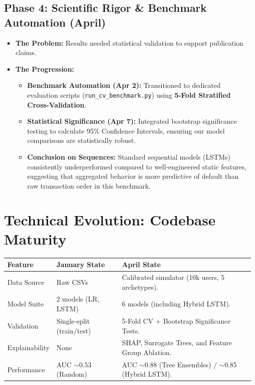 \documentclass[11pt]{article}
\begin{document}
\subsection{Phase 4: Scientific Rigor \& Benchmark Automation (April)}
\begin{itemize}[noitemsep]
    \item \textbf{The Problem:} Results needed statistical validation to support publication claims.
    \item \textbf{The Progression:}
    \begin{itemize}
        \item \textbf{Benchmark Automation (Apr 2):} Transitioned to dedicated evaluation scripts (\texttt{run\_cv\_benchmark.py}) using \textbf{5-Fold Stratified Cross-Validation}.
        \item \textbf{Statistical Significance (Apr 7):} Integrated bootstrap significance testing to calculate 95\% Confidence Intervals, ensuring our model comparisons are statistically robust.
        \item \textbf{Conclusion on Sequences:} Standard sequential models (LSTMs) consistently underperformed compared to well-engineered static features, suggesting that aggregated behavior is more predictive of default than raw transaction order in this benchmark.
    \end{itemize}
\end{itemize}

\section{Technical Evolution: Codebase Maturity}
\begin{table}[h]
\centering
\begin{tabular}{@{}lll@{}}
\toprule
\textbf{Feature} & \textbf{January State} & \textbf{April State} \\ \midrule
Data Source & Raw CSVs & Calibrated simulator (10k users, 5 archetypes). \\
Model Suite & 2 models (LR, LSTM) & 6 models (including Hybrid LSTM). \\
Validation & Single-split (train/test) & 5-Fold CV + Bootstrap Significance Tests. \\
Explainability & None & SHAP, Surrogate Trees, and Feature Group Ablation. \\
Performance & AUC $\sim$0.53 (Random) & AUC $\sim$0.88 (Tree Ensembles) / $\sim$0.85 (Hybrid LSTM). \\ \bottomrule
\end{tabular}
\end{table}
\end{document}
